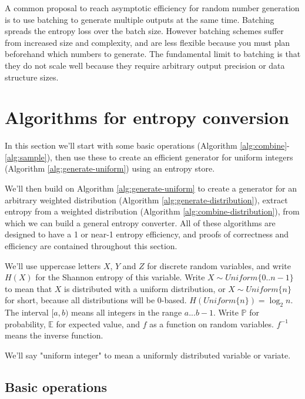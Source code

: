 \documentclass[12pt]{article}
\begin{document}
A common proposal to reach asymptotic efficiency for random number generation is to use batching to generate multiple outputs at the same time. \cite{bacher2017,han97,devroye86,Knuth1976TheCO,lumbroso2013optimal} Batching spreads the entropy loss over the batch size. However batching schemes suffer from increased size and complexity, and are less flexible because you must plan beforehand which numbers to generate. The fundamental limit to batching is that they do not scale well because they require arbitrary output precision or data structure sizes.






\section{Algorithms for entropy conversion}

In this section we'll start with some basic operations (Algorithm \ref{alg:combine}-\ref{alg:sample}), then use these to create an efficient generator for uniform integers (Algorithm \ref{alg:generate-uniform}) using an entropy store.

We'll then build on Algorithm \ref{alg:generate-uniform} to create a generator for an arbitrary weighted distribution (Algorithm \ref{alg:generate-distribution}), extract entropy from a weighted distribution (Algorithm \ref{alg:combine-distribution}), from which we can build a general entropy converter. All of these algorithms are designed to have a 1 or near-1 entropy efficiency, and proofs of correctness and efficiency are contained throughout this section.

We'll use uppercase letters $X$, $Y$ and $Z$ for discrete random variables, and write $H(X)$ for the Shannon entropy of this variable. Write $X \sim Uniform\{0..n-1\}$ to mean that $X$ is distributed with a uniform distribution, or $X \sim Uniform\{n\}$ for short, because all distributions will be 0-based. $H(Uniform\{n\}) = \log_2n$. The interval $[a,b)$ means all integers in the range $a...b-1$. Write $\mathbb{P}$ for probability, $\mathbb{E}$ for expected value, and $f$ as a function on random variables. $f^{-1}$ means the inverse function.

We'll say "uniform integer" to mean a uniformly distributed variable or variate.


\subsection{Basic operations}
\end{document}

